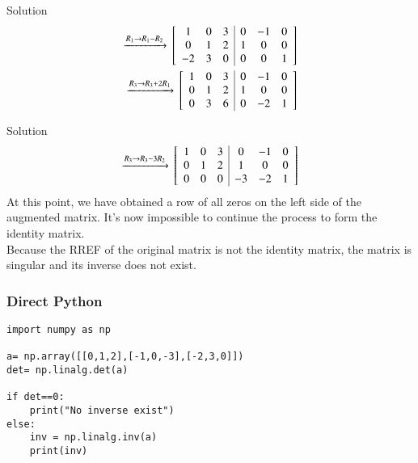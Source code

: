\documentclass{beamer}
\begin{document}
\begin{frame}{Solution}
\begin{align}\xrightarrow[]{R_1\rightarrow R_1-R_2}
    {}\left[\begin{array}{ccc|ccc}
        1  & 0 & 3 & 0 & -1 & 0\\
        0 & 1 &2 & 1 & 0 & 0\\
        -2 & 3 & 0 & 0 & 0 & 1
    \end{array}\right]\\ \xrightarrow[]{R_3\rightarrow R_3+2R_1}
    {}\left[\begin{array}{ccc|ccc}
        1  & 0 & 3 & 0 & -1 & 0\\
        0 & 1 &2 & 1 & 0 & 0\\
        0 & 3 & 6 & 0 & -2 & 1
    \end{array}\right]
    \end{align}
\end{frame}
\begin{frame}{Solution}
\begin{align}\xrightarrow[]{R_3\rightarrow R_3-3R_2}
    {}\left[\begin{array}{ccc|ccc}
        1  & 0 & 3 & 0 & -1 & 0\\
        0 & 1 &2 & 1 & 0 & 0\\
        0 & 0 & 0 & -3 & -2 & 1
    \end{array}\right]
\end{align}
At this point, we have obtained a row of all zeros on the left side of the augmented matrix. It's now impossible to continue the process to form the identity matrix.\\
Because the RREF of the original matrix is not the identity matrix, the matrix is singular and its inverse does not exist.
\end{frame}
\begin{frame}[fragile]
\frametitle{Direct Python}
\begin{lstlisting}
import numpy as np

a= np.array([[0,1,2],[-1,0,-3],[-2,3,0]])
det= np.linalg.det(a)

if det==0:
    print("No inverse exist")
else:
    inv = np.linalg.inv(a)
    print(inv)
\end{lstlisting}
\end{frame}
\end{document}
